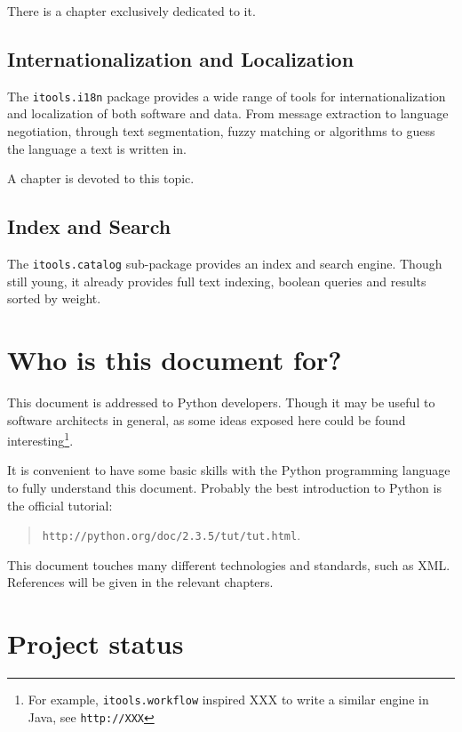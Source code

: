 There is a chapter exclusively dedicated to it.

\subsection{Internationalization and Localization}

The {\tt itools.i18n} package provides a wide range of tools for
internationalization and localization of both software and data. From
message extraction to language negotiation, through text segmentation,
fuzzy matching or algorithms to guess the language a text is written in.

A chapter is devoted to this topic.


\subsection{Index and Search}

The {\tt itools.catalog} sub-package provides an index and search engine.
Though still young, it already provides full text indexing, boolean queries
and results sorted by weight.



\section{Who is this document for?}

This document is addressed to Python developers. Though it may be useful
to software architects in general, as some ideas exposed here could be
found interesting\footnote{For example, {\tt itools.workflow} inspired
XXX to write a similar engine in Java, see {\tt http://XXX}}.

It is convenient to have some basic skills with the Python programming
language to fully understand this document. Probably the best introduction
to Python is the official tutorial:

\begin{quote}
  {\tt http://python.org/doc/2.3.5/tut/tut.html}.
\end{quote}

This document touches many different technologies and standards, such as XML.
References will be given in the relevant chapters.


\section{Project status}

